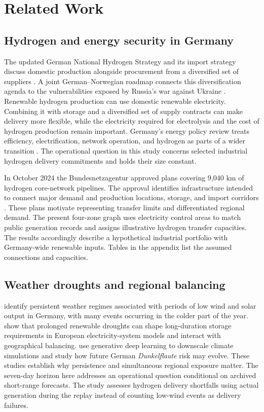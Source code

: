 \documentclass[10pt,a4paper,twocolumn]{article}
\begin{document}
\section{Related Work}
\subsection{Hydrogen and energy security in Germany}
The updated German National Hydrogen Strategy and its import strategy discuss domestic production alongside procurement from a diversified set of suppliers \citep{strategy,imports2024}. A joint German--Norwegian roadmap connects this diversification agenda to the vulnerabilities exposed by Russia's war against Ukraine \citep{roadmap2024}. Renewable hydrogen production can use domestic renewable electricity. Combining it with storage and a diversified set of supply contracts can make delivery more flexible, while the electricity required for electrolysis and the cost of hydrogen production remain important. Germany's energy policy review treats efficiency, electrification, network operation, and hydrogen as parts of a wider transition \citep{iea2025}. The operational question in this study concerns selected industrial hydrogen delivery commitments and holds their size constant.

In October 2024 the Bundesnetzagentur approved plans covering 9{,}040 km of hydrogen core-network pipelines. The approval identifies infrastructure intended to connect major demand and production locations, storage, and import corridors \citep{core2024}. These plans motivate representing transfer limits and differentiated regional demand. The present four-zone graph uses electricity control areas to match public generation records and assigns illustrative hydrogen transfer capacities. The results accordingly describe a hypothetical industrial portfolio with Germany-wide renewable inputs. Tables in the appendix list the assumed connections and capacities.

\subsection{Weather droughts and regional balancing}
\citet{mockert2023} identify persistent weather regimes associated with periods of low wind and solar output in Germany, with many events occurring in the colder part of the year. \citet{kittel2026} show that prolonged renewable droughts can shape long-duration storage requirements in European electricity-system models and interact with geographical balancing. \citet{strnad2026} use generative deep learning to downscale climate simulations and study how future German \emph{Dunkelflaute} risk may evolve. These studies establish why persistence and simultaneous regional exposure matter. The seven-day horizon here addresses an operational question conditional on archived short-range forecasts. The study assesses hydrogen delivery shortfalls using actual generation during the replay instead of counting low-wind events as delivery failures.
\end{document}

